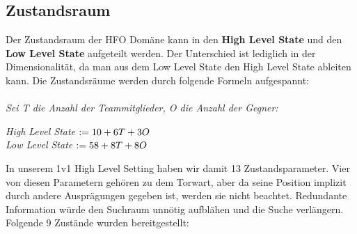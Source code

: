         \subsection{Zustandsraum}
            Der Zustandsraum der HFO Domäne kann in den \textbf{High Level State} und den \textbf{Low Level State} aufgeteilt werden. Der Unterschied ist lediglich in der Dimensionalität, da man aus dem Low Level State den High Level State ableiten kann. Die Zustandsräume werden durch folgende Formeln aufgespannt:\\
            \\
            \textit{Sei T die Anzahl der Teammitglieder, O die Anzahl der Gegner:}
            \begin{center}
                \textit{High Level State} $ := 10 + 6T + 3O \hspace{10mm} $ \\
                \textit{Low Level State}  $ := 58 + 8T + 8O \hspace{9mm} $ \\
            \end{center}
            In unserem 1v1 High Level Setting haben wir damit 13 Zustandsparameter. Vier von diesen Parametern gehören zu dem Torwart, aber da seine Position implizit durch andere Ausprägungen gegeben ist, werden sie nicht beachtet. Redundante Information würde den Suchraum unnötig aufblähen und die Suche verlängern. Folgende 9 Zustände wurden bereitgestellt:

